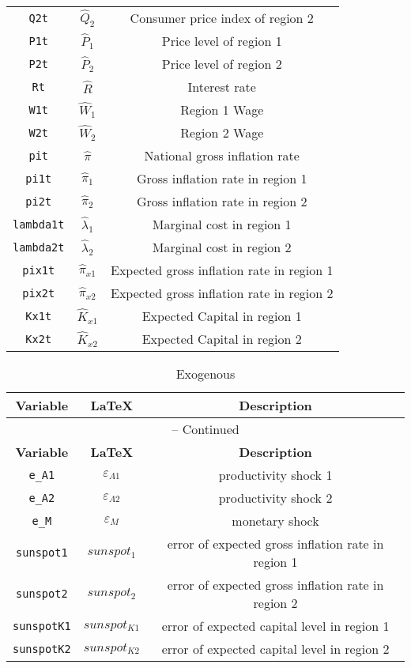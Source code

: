 \begin{center}
\begin{longtable}{ccc}
\texttt{Q2t} & ${\hat{Q}_{2}}$ & Consumer price index of region 2\\
\texttt{P1t} & ${\hat{P}_{1}}$ & Price level of region 1\\
\texttt{P2t} & ${\hat{P}_{2}}$ & Price level of region 2\\
\texttt{Rt} & ${\hat{R}}$ & Interest rate\\
\texttt{W1t} & ${\hat{W}_{1}}$ & Region 1 Wage\\
\texttt{W2t} & ${\hat{W}_{2}}$ & Region 2 Wage\\
\texttt{pit} & ${\hat{\pi}}$ & National gross inflation rate\\
\texttt{pi1t} & ${\hat{\pi}_{1}}$ & Gross inflation rate in region 1\\
\texttt{pi2t} & ${\hat{\pi}_{2}}$ & Gross inflation rate in region 2\\
\texttt{lambda1t} & ${\hat{\lambda}_{1}}$ & Marginal cost in region 1\\
\texttt{lambda2t} & ${\hat{\lambda}_{2}}$ & Marginal cost in region 2\\
\texttt{pix1t} & ${\hat{\pi}_{x1}}$ & Expected gross inflation rate in region 1\\
\texttt{pix2t} & ${\hat{\pi}_{x2}}$ & Expected gross inflation rate in region 2\\
\texttt{Kx1t} & ${\hat{K}_{x1}}$ & Expected Capital in region 1\\
\texttt{Kx2t} & ${\hat{K}_{x2}}$ & Expected Capital in region 2\\
\hline%
\end{longtable}
\end{center}
\begin{center}
\begin{longtable}{ccc}
\caption{Exogenous}\\%
\hline%
\multicolumn{1}{c}{\textbf{Variable}} &
\multicolumn{1}{c}{\textbf{\LaTeX}} &
\multicolumn{1}{c}{\textbf{Description}}\\%
\hline\hline%
\endfirsthead
\multicolumn{3}{c}{{\tablename} \thetable{} -- Continued}\\%
\hline%
\multicolumn{1}{c}{\textbf{Variable}} &
\multicolumn{1}{c}{\textbf{\LaTeX}} &
\multicolumn{1}{c}{\textbf{Description}}\\%
\hline\hline%
\endhead
\texttt{e\_A1} & ${\varepsilon_{A1}}$ & productivity shock 1\\
\texttt{e\_A2} & ${\varepsilon_{A2}}$ & productivity shock 2\\
\texttt{e\_M} & ${\varepsilon_{M}}$ & monetary shock\\
\texttt{sunspot1} & ${sunspot_{1}}$ & error of expected gross inflation rate in region 1\\
\texttt{sunspot2} & ${sunspot_{2}}$ & error of expected gross inflation rate in region 2\\
\texttt{sunspotK1} & ${sunspot_{K1}}$ & error of expected capital level in region 1\\
\texttt{sunspotK2} & ${sunspot_{K2}}$ & error of expected capital level in region 2\\
\hline%
\end{longtable}
\end{center}
